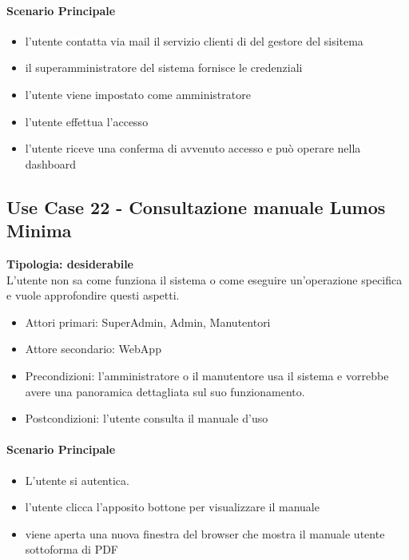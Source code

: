 \documentclass[12pt]{article}
\begin{document}
\paragraph{Scenario Principale}
\begin{itemize}
	\item l'utente contatta via mail il servizio clienti di del gestore del sisitema
	\item il superamministratore del sistema fornisce le credenziali
	\item l'utente viene impostato come amministratore
	\item l'utente effettua l'accesso
	\item l'utente riceve una conferma di avvenuto accesso e può operare nella dashboard
\end{itemize}

\subsection{Use Case 22 - Consultazione manuale Lumos Minima}
\textbf{Tipologia: desiderabile}\\
L'utente non sa come funziona il sistema o come eseguire un'operazione specifica e vuole approfondire questi aspetti.
\begin{itemize}
	\item Attori primari: SuperAdmin, Admin, Manutentori
	\item Attore secondario: WebApp
	\item Precondizioni: l'amministratore o il manutentore usa il sistema e vorrebbe avere una panoramica dettagliata sul suo funzionamento.
	\item Postcondizioni: l'utente consulta il manuale d'uso
\end{itemize}
\paragraph{Scenario Principale}
\begin{itemize}
	\item L'utente si autentica.
	\item l'utente clicca l'apposito bottone per visualizzare il manuale
	\item viene aperta una nuova finestra del browser che mostra il manuale utente sottoforma di PDF
\end{itemize}
\end{document}
